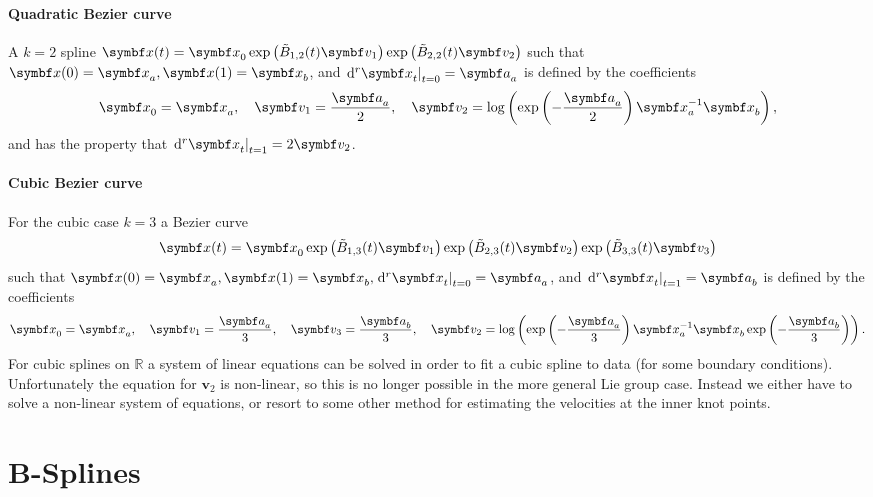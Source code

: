 \paragraph{Quadratic Bezier curve} A $k=2$ spline $\x(t) = \x_{0} \exp \left( \tilde B_{1, 2}(t) \symbf v_{1}\right) \exp\left(\tilde B_{2, 2}(t) \symbf v_{2}\right)$ such that $\x(0) = \x_{a}, \x(1) = \x_{b}$, and $\left. \mathrm{d}^{r} \x_{t} \right|_{t=0} = \a_{a}$ is defined by the coefficients
\begin{equation}
  \x_{0}  = \x_{a}, \quad
  \symbf v_{1} = \frac{\a_{a}}{2}, \quad  \symbf v_{2} = \log \left( \exp \left( -\frac{\a_{a}}{2} \right) \x_{a}^{-1} \x_{b} \right),
\end{equation}
and has the property that $\left. \mathrm{d}^{r} \x_{t} \right|_{t=1} = 2 \symbf v_{2}$.

\paragraph{Cubic Bezier curve} For the cubic case $k = 3$ a Bezier curve
\begin{equation}
  \x(t) = \x_{0} \exp \left( \tilde B_{1, 3}(t) \symbf v_{1}\right) \exp\left(\tilde B_{2, 3}(t) \symbf v_{2}\right)\exp\left(\tilde B_{3, 3}(t) \symbf v_{3}\right)
\end{equation}
  such that $\x(0) = \x_{a}, \x(1) = \x_{b}, \left. \mathrm{d}^{r} \x_{t} \right|_{t = 0} = \a_{a}$, and $\left. \mathrm{d}^{r} \x_{t} \right|_{t = 1} = \a_{b}$ is defined by the coefficients
\begin{equation}
  \x_{0}  = \x_{a}, \quad
  \symbf v_{1} = \frac{\a_{a}}{3}, \quad  \symbf v_{3} = \frac{\a_{b}}{3}, \quad  \symbf v_{2} = \log \left( \exp \left( -\frac{\a_{a}}{3} \right) \x_{a}^{-1} \x_{b} \exp \left( -\frac{\a_{b}}{3} \right ) \right).
\end{equation}
For cubic splines on $\mathbb{R}$ a system of linear equations can be solved in order to fit a cubic spline to data (for some boundary conditions). Unfortunately the equation for $\symbf v_{2}$ is non-linear, so this is no longer possible in the more general Lie group case. Instead we either have to solve a non-linear system of equations, or resort to some other method for estimating the velocities at the inner knot points.

\section{B-Splines}

